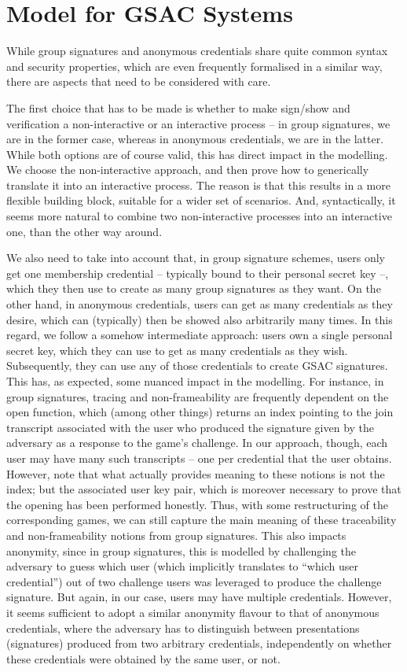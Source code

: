 \section{Model for GSAC Systems}
\label{sec:model}

While group signatures and anonymous credentials share quite common syntax and
security properties, which are even frequently formalised in a similar way,
there are aspects that need to be considered with care.

The first choice that has to be made is whether to make sign/show and
verification a non-interactive or an interactive process -- in group signatures,
we are in the former case, whereas in anonymous credentials, we are in the
latter. While both options are of course valid, this has direct impact in the
modelling. We choose the non-interactive approach, and then prove how to
generically translate it into an interactive process. The reason is that this
results in a more flexible building block, suitable for a wider set of
scenarios. And, syntactically, it seems more natural to combine two
non-interactive processes into an interactive one, than the other way around.

We also need to take into account that, in group signature schemes, users only
get one membership credential -- typically bound to their personal secret
key --, which they then use to create as many group signatures as they want. On
the other hand, in anonymous credentials, users can get as many credentials as
they desire, which can (typically) then be showed also arbitrarily many times.
In this regard, we follow a somehow intermediate approach: users own a single
personal secret key, which they can use to get as many credentials as they wish.
Subsequently, they can use any of those credentials to create GSAC signatures.
This has, as expected, some nuanced impact in the modelling. For instance, in
group signatures, tracing and non-frameability are frequently dependent on the
open function, which (among other things) returns an index pointing to the join
transcript associated with the user who produced the signature given by the
adversary as a response to the game's challenge. In our approach, though, each
user may have many such transcripts -- one per credential that the user
obtains. However, note that what actually provides meaning to these notions
is not the index; but the associated user key pair, which is moreover necessary
to prove that the opening has been performed honestly. Thus, with some
restructuring of the corresponding games, we can still capture the main
meaning of these traceability and non-frameability notions from group
signatures. This also impacts anonymity, since in group signatures, this is
modelled by challenging the adversary to guess which user (which implicitly
translates to ``which user credential'') out of two challenge users was
leveraged to produce the challenge signature. But again, in our case, users may
have multiple credentials. However, it seems sufficient to adopt a similar
anonymity flavour to that of anonymous credentials, where the adversary has to
distinguish between presentations (signatures) produced from two arbitrary
credentials, independently on whether these credentials were obtained by the
same user, or not.

